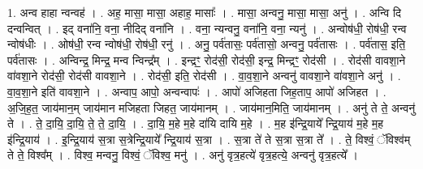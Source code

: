 \documentclass[17pt]{extarticle}
\begin{document}
1. अन्व हाहा न्वन्वह॑ । . अह॒ मासा॒ मासा॒ अहाह॒ मासाः᳚ । . मासा॒ अन्वनु॒ मासा॒ मासा॒ अनु॑ । . अन्वि दि दन्वन्वित् । . इद् वना॑नि॒ वना॒ नीदिद् वना॑नि । . वना॒ न्यन्वनु॒ वना॑नि॒ वना॒ न्यनु॑ । . अन्वोष॑धी॒ रोष॑धी॒ रन्व न्वोष॑धीः । . ओष॑धी॒ रन्व न्वोष॑धी॒ रोष॑धी॒ रनु॑ । . अनु॒ पर्व॑तासः॒ पर्व॑तासो॒ अन्वनु॒ पर्व॑तासः । . पर्व॑तास॒ इति॒ पर्व॑तासः । . अन्विन्द्र॒ मिन्द्र॒ मन्व न्विन्द्र᳚म् । . इन्द्रꣳ॒॒ रोद॑सी॒ रोद॑सी॒ इन्द्र॒ मिन्द्रꣳ॒॒ रोद॑सी । . रोद॑सी वावशा॒ने वा॑वशा॒ने रोद॑सी॒ रोद॑सी वावशा॒ने । . रोद॑सी॒ इति॒ रोद॑सी । . वा॒व॒शा॒ने अन्वनु॑ वावशा॒ने वा॑वशा॒ने अनु॑ । . वा॒व॒शा॒ने इति॑ वावशा॒ने । . अन्वाप॒ आपो॒ अन्वन्वापः॑ । . आपो॑ अजिहता जिह॒ताप॒ आपो॑ अजिहत । . अ॒जि॒ह॒त॒ जाय॑मान॒म् जाय॑मान मजिहता जिहत॒ जाय॑मानम् । . जाय॑मान॒मिति॒ जाय॑मानम् । . अनु॑ ते ते॒ अन्वनु॑ ते । . ते॒ दा॒यि॒ दा॒यि॒ ते॒ ते॒ दा॒यि॒ । . दा॒यि॒ म॒हे म॒हे दा॑यि दायि म॒हे । . म॒ह इ॑न्द्रि॒याये᳚ न्द्रि॒याय॑ म॒हे म॒ह इ॑न्द्रि॒याय॑ । . इ॒न्द्रि॒याय॑ स॒त्रा स॒त्रेन्द्रि॒याये᳚ न्द्रि॒याय॑ स॒त्रा । . स॒त्रा ते॑ ते स॒त्रा स॒त्रा ते᳚ । . ते॒ विश्वं॒ ॅविश्व॑म् ते ते॒ विश्व᳚म् । . विश्व॒ मन्वनु॒ विश्वं॒ ॅविश्व॒ मनु॑ । . अनु॑ वृत्र॒हत्ये॑ वृत्र॒हत्ये॒ अन्वनु॑ वृत्र॒हत्ये᳚ । \newline
\end{document}
